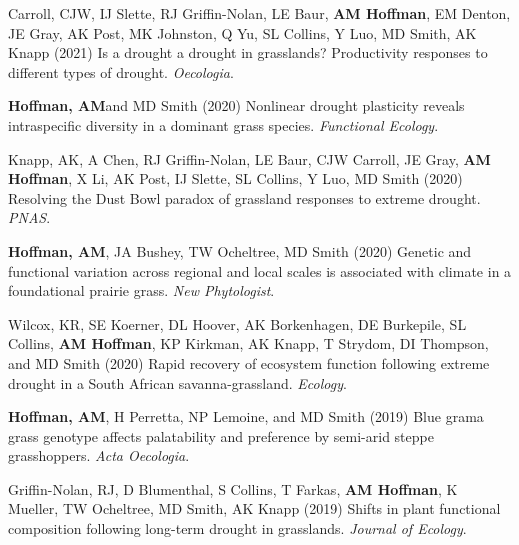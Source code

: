 \documentclass{cv}
\begin{document}
\begin{pubenum}
\item Carroll, CJW, IJ Slette, RJ Griffin-Nolan, LE Baur, \textbf{AM Hoffman}, EM Denton, JE Gray, AK Post, MK Johnston, Q Yu, SL Collins, Y Luo, MD Smith, AK Knapp (2021) Is a drought a drought in grasslands? Productivity responses to different types of drought. \textit{Oecologia}. 

\item\textbf{Hoffman, AM}\footnotemark[1] and MD Smith (2020) Nonlinear drought plasticity reveals intraspecific diversity in a dominant grass species. \textit{Functional Ecology}. \footnotemark[\value{footnote}]

\item Knapp, AK, A Chen, RJ Griffin-Nolan, LE Baur, CJW Carroll, JE Gray, \textbf{AM Hoffman}, X Li, AK Post, IJ Slette, SL Collins, Y Luo, MD Smith (2020) Resolving the Dust Bowl paradox of grassland responses to extreme drought. \textit{PNAS}. 

\item\textbf{Hoffman, AM}\footnotemark[1], JA Bushey, TW Ocheltree, MD Smith (2020) Genetic and functional variation across regional and local scales is associated with climate in a foundational prairie grass. \textit{New Phytologist}. 

\item Wilcox, KR, SE Koerner, DL Hoover, AK Borkenhagen, DE Burkepile, SL Collins, \textbf{AM Hoffman}, KP Kirkman, AK Knapp, T Strydom, DI Thompson, and MD Smith (2020) Rapid recovery of ecosystem function following extreme drought in a South African savanna-grassland. \textit{Ecology}. 

\item\textbf{Hoffman, AM}\footnotemark[1], H Perretta\footnotemark[2], NP Lemoine, and MD Smith (2019) Blue grama grass genotype affects palatability and preference by semi-arid steppe grasshoppers. \textit{Acta Oecologia}. 


\item Griffin-Nolan, RJ, D Blumenthal, S Collins, T Farkas, \textbf{AM Hoffman}, K Mueller, TW Ocheltree, MD Smith, AK Knapp (2019) Shifts in plant functional composition following long-term drought in grasslands. \textit{Journal of Ecology}. 


\end{pubenum}
\end{document}
